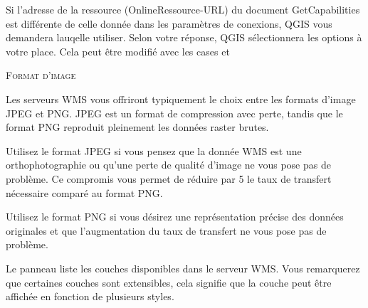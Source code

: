 
Si l'adresse de la ressource (OnlineRessource-URL) du document GetCapabilities est différente de celle donnée dans les paramètres de conexions, QGIS vous demandera lauqelle utiliser. Selon votre réponse, QGIS sélectionnera les options à votre place. Cela peut être modifié avec les cases  et 

\begin{Tip}[ht]\caption{\textsc{Format d'image}}

Les serveurs WMS vous offriront typiquement le choix entre les formats d'image JPEG et PNG. JPEG est un format de compression avec perte, tandis que le format PNG reproduit pleinement les données raster brutes.

Utilisez le format JPEG si vous pensez que la donnée WMS est une orthophotographie ou qu'une perte de qualité d'image ne vous pose pas de problème. Ce compromis vous permet de réduire par 5 le taux de transfert nécessaire comparé au  format PNG.

Utilisez le format PNG si vous désirez une représentation précise des données originales et que l'augmentation du taux de transfert ne vous pose pas de problème.
\end{Tip}

 \label{ogc-wms-layers}

Le panneau  liste les couches disponibles dans le serveur WMS. Vous remarquerez que certaines couches sont extensibles, cela signifie que la couche peut être affichée en fonction de plusieurs styles.

